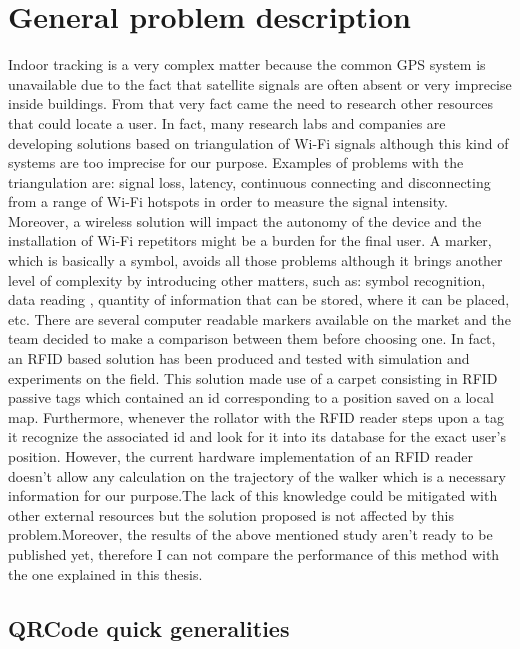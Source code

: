 \chapter{General problem description}

Indoor tracking is a very complex matter because the common GPS system is unavailable due to the fact that satellite signals are often absent or very imprecise inside buildings. From that very fact came the need to research other resources that could locate a user. In fact, many research labs and companies are developing solutions based on triangulation of Wi-Fi signals although this kind of systems are too imprecise\cite{wifiimprecise} for our purpose. 
Examples of problems with the triangulation are: signal loss, latency, continuous connecting and disconnecting from a range of Wi-Fi hotspots in order to measure the signal intensity. Moreover, a wireless solution will impact the autonomy of the device and the installation of Wi-Fi repetitors might be a burden for the final user. 
A marker, which is basically a symbol, avoids all those problems although it brings another level of complexity by introducing other matters, such as: symbol recognition, data reading , quantity of information that can be stored, where it can be placed, etc.
There are several computer readable markers available on the market and the team decided to make a comparison between them before choosing one.
In fact, an RFID based solution has been produced and tested with simulation and experiments on the field.
This solution made use of a carpet consisting in RFID passive tags which contained an id corresponding to a position saved on a local map. Furthermore, whenever the rollator with the RFID reader steps upon a tag it recognize the associated id and look for it into its database for the exact user's position. However, the current hardware implementation of an RFID reader doesn't allow any calculation on the trajectory of the walker which is a necessary information for our purpose.The lack of this knowledge could be mitigated with other external resources but the solution proposed is not affected by this problem.Moreover, the results of the above mentioned study aren't ready to be published yet, therefore I can not compare the performance of this method with the one explained in this thesis.
 


\section{QRCode quick generalities}

